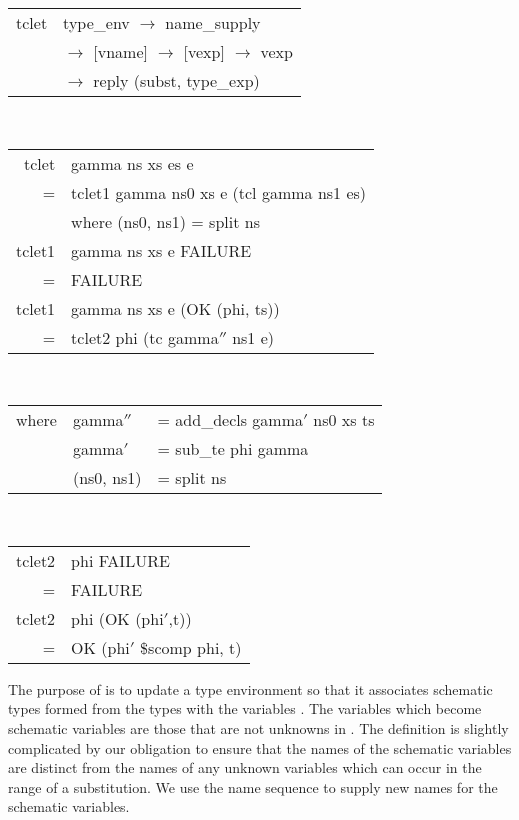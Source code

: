 \begin{mlcoded}
    \begin{tabular}{l@{\hspace{6pt}}l}
        tclet \hastype{} &type\_env $\rightarrow$ name\_supply \\
        &$\rightarrow$ [vname] $\rightarrow$ [vexp] $\rightarrow$ vexp \\
        &$\rightarrow$ reply (subst, type\_exp) \\
    \end{tabular}\\
    \begin{tabular}{r@{\hspace{4pt}}l}
        tclet &gamma ns xs es e \\
        = &tclet1 gamma ns0 xs e (tcl gamma ns1 es) \\
        \vspace{.2cm}
        &where (ns0, ns1) = split ns\\
        tclet1 &gamma ns xs e FAILURE \\
        = &FAILURE \\
        tclet1 &gamma ns xs e (OK (phi, ts)) \\
        = &tclet2 phi (tc gamma$''$ ns1 e) \\
    \end{tabular}\\
    \begin{tabular}{l@{\hspace{4pt}}l@{\hspace{4pt}}l}
        \hspace*{1cm}where &gamma$''$ &= add\_decls gamma$'$ ns0 xs ts \\
        &gamma$'$  &= sub\_te phi gamma \\
    \vspace{.2cm}
        &(ns0, ns1) &= split ns
    \end{tabular}\\
    \begin{tabular}{r@{\hspace{4pt}}l}
        tclet2 &phi FAILURE \\
        = &FAILURE \\
        tclet2 &phi (OK (phi$'$,t)) \\
        = &OK (phi$'$ \$scomp phi, t)
    \end{tabular}
\end{mlcoded}
The purpose of  is to update a type environment  so that it
associates schematic types formed from the types  with the variables . The
variables which become schematic variables are those that are not unknowns
in . The definition is slightly complicated by our obligation to ensure
that the names of the schematic variables are distinct from the names of any
unknown variables which can occur in the range of a substitution. We use the
name sequence  to supply new names for the schematic variables.

